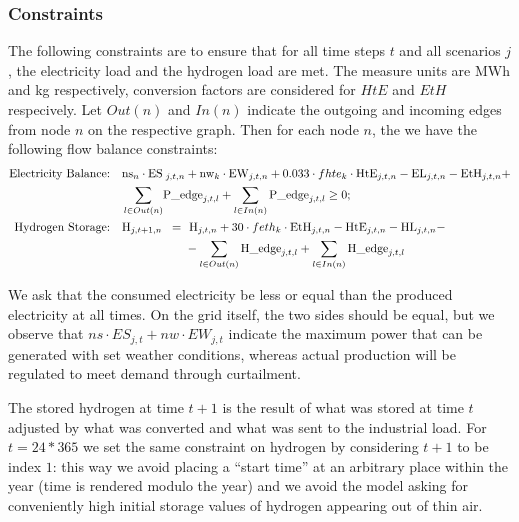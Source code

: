 
\subsubsection{Constraints}
The following constraints are to ensure that for all time steps $t$ and all scenarios $j$, the electricity load and the hydrogen load are met. The measure units are MWh and kg respectively, conversion factors are considered for $HtE$ and $EtH$ respecively.
Let $Out(n)$ and $In(n)$ indicate the outgoing and incoming edges from node $n$ on the respective graph. Then for each node $n$, the we have the following flow balance constraints:
\begin{align*}
    \text{Electricity Balance:} \quad & \text{ns}_n \cdot \text{ES}\hspace{-1em}&_{j,t,n}&+ \text{nw}_k \cdot \text{EW}_{j,t,n} + 0.033 \cdot fhte_k \cdot \text{HtE}_{j,t,n} - \text{EL}_{j,t,n} - \text{EtH}_{j,t,n} + \\
    & \sum_{l\in Out(n)}\hspace{-1em}& \text{P\_e}&\text{dge}_{j,t,l} + \sum_{l\in In(n)} \text{P\_edge}_{j,t,l} \ge 0;\\
    \text{Hydrogen Storage:} \quad & \text{H}_{j,t+1,n} \hspace{-1em}&=\ & \text{ H}_{j,t,n} + 30 \cdot feth_k \cdot \text{EtH}_{j,t,n} - \text{HtE}_{j,t,n} - \text{HL}_{j,t,n} -\\ &&& - \sum_{l\in Out(n)}\text{H\_edge}_{j,t,l} + \sum_{l\in In(n)}\text{H\_edge}_{j,t,l}
\end{align*}

We ask that the consumed electricity be less or equal than the produced electricity at all times. On the grid itself, the two sides should be equal, but we observe that $ns\cdot ES_{j,t} + nw\cdot EW_{j,t}$ indicate the maximum power that can be generated with set weather conditions, whereas actual production will be regulated to meet demand through curtailment.

The stored hydrogen at time $t+1$ is the result of what was stored at time $t$ adjusted by what was converted and what was sent to the industrial load. For $t=24*365$ we set the same constraint on hydrogen by considering $t+1$ to be index $1$: this way we avoid placing a ``start time'' at an arbitrary place within the year (time is rendered modulo the year) and we avoid the model asking for conveniently high initial storage values of hydrogen appearing out of thin air.

